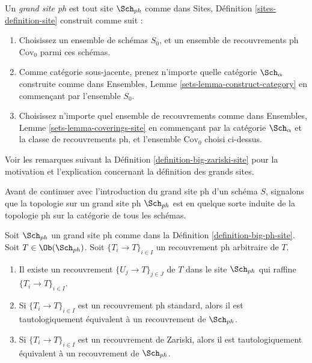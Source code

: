 \begin{definition}
\label{definition-big-ph-site}
Un {\it grand site ph} est tout site $\Sch_{ph}$ comme dans Sites, Définition \ref{sites-definition-site} construit comme suit :
\begin{enumerate}
\item Choisissez un ensemble de schémas $S_0$, et un ensemble de recouvrements ph $\text{Cov}_0$ parmi ces schémas.
\item Comme catégorie sous-jacente, prenez n'importe quelle catégorie $\Sch_\alpha$\newline construite comme dans Ensembles, Lemme \ref{sets-lemma-construct-category} en commençant par l'ensemble $S_0$.
\item Choisissez n'importe quel ensemble de recouvrements comme dans Ensembles, Lemme \ref{sets-lemma-coverings-site} en commençant par la catégorie $\Sch_\alpha$ et la classe de recouvrements ph, et l'ensemble $\text{Cov}_0$ choisi ci-dessus.
\end{enumerate}
\end{definition}

\noindent
Voir les remarques suivant la Définition \ref{definition-big-zariski-site} pour la motivation et l'explication concernant la définition des grands sites.

\medskip\noindent
Avant de continuer avec l'introduction du grand site ph d'un schéma $S$, signalons que la topologie sur un grand site ph $\Sch_{ph}$ est en quelque sorte induite de la topologie ph sur la catégorie de tous les schémas.

\begin{lemma}
\label{lemma-ph-induced}
Soit $\Sch_{ph}$ un grand site ph comme dans la Définition \ref{definition-big-ph-site}. Soit $T \in \Ob(\Sch_{ph})$. Soit $\{T_i \to T\}_{i \in I}$ un recouvrement ph arbitraire de $T$.
\begin{enumerate}
\item Il existe un recouvrement $\{U_j \to T\}_{j \in J}$ de $T$ dans le site $\Sch_{ph}$ qui raffine $\{T_i \to T\}_{i \in I}$.
\item Si $\{T_i \to T\}_{i \in I}$ est un recouvrement ph standard, alors il est tautologiquement équivalent à un recouvrement de $\Sch_{ph}$.
\item Si $\{T_i \to T\}_{i \in I}$ est un recouvrement de Zariski, alors il est tautologiquement équivalent à un recouvrement de $\Sch_{ph}$.
\end{enumerate}
\end{lemma}

